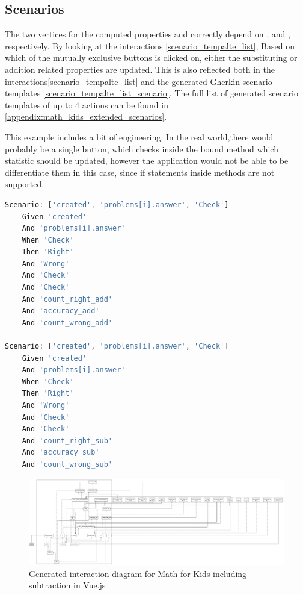 \subsection{Scenarios}

The two vertices for the computed properties  and  correctly depend on ,  and ,  respectively. By looking at the interactions \ref{scenario_tempalte_list}, 
Based on which of the mutually exclusive  buttons is clicked on, either the substituting or addition related properties are updated. This is also reflected both in the interactions\ref{scenario_tempalte_list} and the generated Gherkin scenario templates \ref{scenario_tempalte_list_scenario}. The full list of generated scenario templates of up to 4 actions can be found in \ref{appendix:math_kids_extended_scenarios}.

This example includes a bit of engineering. In the real world,there would probably be a single button, which checks inside the bound method which statistic should be updated, however the application would not be able to be differentiate them in this case, since if statements inside methods are not supported.

\newpage
\label{scenario_tempalte_list_scenario}
\begin{lstlisting}[language=JavaScript,caption = {Chosen scenarios of the Math for Kids Extended application}, captionpos=b]
Scenario: ['created', 'problems[i].answer', 'Check']
	Given 'created'
	And 'problems[i].answer'
	When 'Check'
	Then 'Right'
	And 'Wrong'
	And 'Check'
	And 'Check'
	And 'count_right_add'
	And 'accuracy_add'
    And 'count_wrong_add'

Scenario: ['created', 'problems[i].answer', 'Check']
	Given 'created'
	And 'problems[i].answer'
	When 'Check'
	Then 'Right'
	And 'Wrong'
	And 'Check'
	And 'Check'
	And 'count_right_sub'
	And 'accuracy_sub'
	And 'count_wrong_sub'
\end{lstlisting}

\begin{figure}[H]
    \centering
    \includegraphics[width=\textwidth]{images/diagram_list_add_sub.png}
     \caption{Generated interaction diagram for Math for Kids including subtraction in Vue.js}
     \label{fig:diagram_list_complex}
\end{figure}


